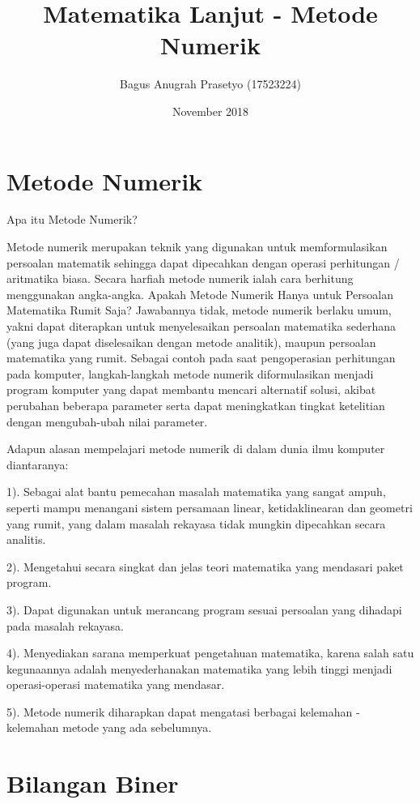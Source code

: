 \documentclass{article}
\title{Matematika Lanjut - Metode Numerik}
\author{Bagus Anugrah Prasetyo (17523224)}
\date{November 2018}
\begin{document}
\maketitle

\section*{Metode Numerik}

Apa itu Metode Numerik?

Metode numerik merupakan teknik yang digunakan untuk memformulasikan persoalan matematik sehingga dapat dipecahkan dengan operasi perhitungan / aritmatika biasa. Secara harfiah metode numerik ialah cara berhitung menggunakan angka-angka. Apakah Metode Numerik Hanya untuk Persoalan Matematika Rumit Saja? Jawabannya tidak, metode numerik berlaku umum, yakni dapat diterapkan untuk menyelesaikan persoalan matematika sederhana (yang juga dapat diselesaikan dengan metode analitik), maupun  persoalan matematika yang rumit. Sebagai contoh pada saat pengoperasian perhitungan pada komputer, langkah-langkah metode numerik diformulasikan menjadi program komputer yang dapat membantu mencari alternatif solusi, akibat perubahan beberapa parameter serta dapat meningkatkan tingkat ketelitian dengan mengubah-ubah nilai parameter. 

Adapun alasan mempelajari metode numerik di dalam dunia ilmu komputer diantaranya: 

1). Sebagai alat bantu pemecahan masalah matematika yang sangat ampuh, seperti mampu menangani sistem persamaan linear, ketidaklinearan dan geometri yang rumit, yang dalam masalah rekayasa tidak mungkin dipecahkan secara analitis.

2). Mengetahui secara singkat dan jelas teori matematika yang mendasari paket program.

3). Dapat digunakan untuk merancang program sesuai persoalan yang dihadapi pada masalah rekayasa.

4). Menyediakan sarana memperkuat pengetahuan matematika, karena salah satu kegunaannya adalah menyederhanakan matematika yang lebih tinggi menjadi operasi-operasi matematika yang mendasar.

5). Metode numerik diharapkan dapat mengatasi berbagai kelemahan - kelemahan metode yang ada sebelumnya.

\section*{Bilangan Biner}
\end{document}
